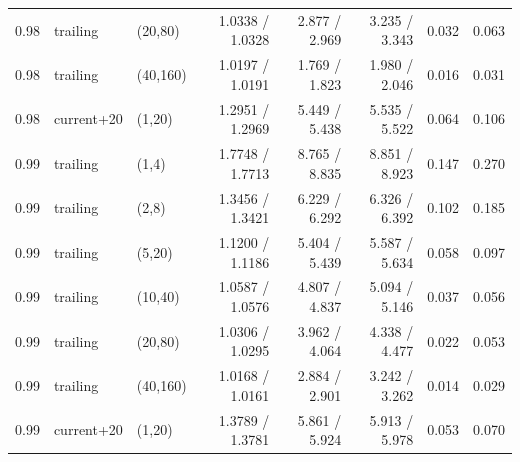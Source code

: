\begin{tabular}{lllrrrrr}
0.98 & trailing & (20,80) & 1.0338 / 1.0328 & 2.877 / 2.969 & 3.235 / 3.343 & 0.032 & 0.063\\
0.98 & trailing & (40,160) & 1.0197 / 1.0191 & 1.769 / 1.823 & 1.980 / 2.046 & 0.016 & 0.031\\
0.98 & current+20 & (1,20) & 1.2951 / 1.2969 & 5.449 / 5.438 & 5.535 / 5.522 & 0.064 & 0.106\\
0.99 & trailing & (1,4) & 1.7748 / 1.7713 & 8.765 / 8.835 & 8.851 / 8.923 & 0.147 & 0.270\\
0.99 & trailing & (2,8) & 1.3456 / 1.3421 & 6.229 / 6.292 & 6.326 / 6.392 & 0.102 & 0.185\\
0.99 & trailing & (5,20) & 1.1200 / 1.1186 & 5.404 / 5.439 & 5.587 / 5.634 & 0.058 & 0.097\\
0.99 & trailing & (10,40) & 1.0587 / 1.0576 & 4.807 / 4.837 & 5.094 / 5.146 & 0.037 & 0.056\\
0.99 & trailing & (20,80) & 1.0306 / 1.0295 & 3.962 / 4.064 & 4.338 / 4.477 & 0.022 & 0.053\\
0.99 & trailing & (40,160) & 1.0168 / 1.0161 & 2.884 / 2.901 & 3.242 / 3.262 & 0.014 & 0.029\\
0.99 & current+20 & (1,20) & 1.3789 / 1.3781 & 5.861 / 5.924 & 5.913 / 5.978 & 0.053 & 0.070\\
\bottomrule
\end{tabular}
